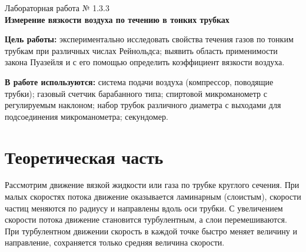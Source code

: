 \documentclass[a4paper,12pt]{article} %
\begin{document}




\begin{center}   
    \hfill \break
	\hfill \break
	\hfill \break
	\hfill \break
	\large{Лабораторная работа № 1.3.3\\\textbf{Измерение вязкости воздуха по течению в тонких трубках}}\\
\end{center}



\textbf{Цель работы:} экспериментально исследовать свойства течения газов по тонким трубкам при различных числах Рейнольдса; выявить область применимости закона Пуазейля и с его помощью определить коэффициент вязкости воздуха.\hfill
\break
	
\textbf{В работе используются:} система подачи воздуха (компрессор, поводящие трубки); газовый счетчик барабанного типа; спиртовой микроманометр с регулируемым наклоном; набор трубок различного диаметра с выходами для подсоединения микроманометра; секундомер.


\section{Теоретическая часть}
Рассмотрим движение вязкой жидкости или газа по трубке круглого сечения. При малых скоростях потока движение оказывается ламинарным (слоистым), скорости частиц меняются по радиусу и направлены вдоль оси трубки. С увеличением скорости потока движение становится турбулентным, а слои перемешиваются. При турбулентном движении скорость в каждой точке быстро меняет величину и направление, сохраняется только средняя величина скорости.
\end{document}
